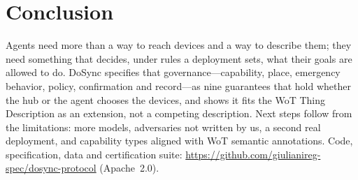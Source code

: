 \documentclass[conference]{IEEEtran}
\begin{document}
\section{Conclusion}
Agents need more than a way to reach devices and a way to describe them; they need something that decides, under rules a deployment sets, what their goals are allowed to do. DoSync specifies that governance---capability, place, emergency behavior, policy, confirmation and record---as nine guarantees that hold whether the hub or the agent chooses the devices, and shows it fits the WoT Thing Description as an extension, not a competing description. Next steps follow from the limitations: more models, adversaries not written by us, a second real deployment, and capability types aligned with WoT semantic annotations. Code, specification, data and certification suite: \url{https://github.com/giulianireg-spec/dosync-protocol} (Apache~2.0).



\end{document}
